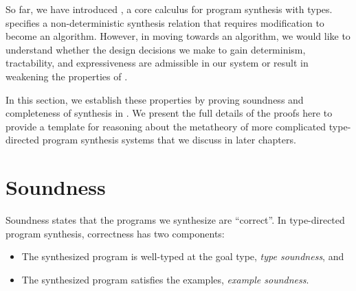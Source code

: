 So far, we have introduced \lsyn{}, a core calculus for program synthesis with types.
\lsyn{} specifies a non-deterministic synthesis relation that requires modification to become an algorithm.
However, in moving towards an algorithm, we would like to understand whether the design decisions we make to gain determinism, tractability, and expressiveness are admissible in our system or result in weakening the properties of \lsyn{}.

In this section, we establish these properties by proving soundness and completeness of synthesis in \lsyn{}.
We present the full details of the proofs here to provide a template for reasoning about the metatheory of  more complicated type-directed program synthesis systems that we discuss in later chapters.

\section{Soundness}

Soundness states that the programs we synthesize are ``correct''.
In type-directed program synthesis, correctness has two components:
\begin{itemize}
  \item The synthesized program is well-typed at the goal type, \emph{type soundness}, and
  \item The synthesized program satisfies the examples, \emph{example soundness}.
\end{itemize}

